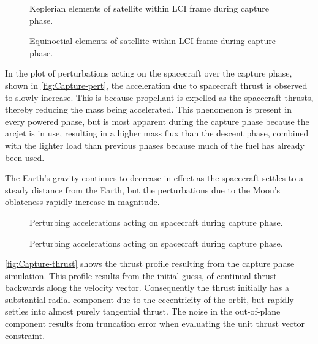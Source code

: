 \begin{figure}
\centering
\def\svgwidth{\figurewidth}

\caption{Keplerian elements of satellite within LCI frame during capture phase.}
\label{fig:Capture-kep-lci}
\end{figure}

\begin{figure}
\centering
\def\svgwidth{\figurewidth}

\caption{Equinoctial elements of satellite within LCI frame during capture phase.}
\label{fig:Capture-mee}
\end{figure}

In the plot of perturbations acting on the spacecraft over the capture phase, shown in \autoref{fig:Capture-pert}, the acceleration due to spacecraft thrust is observed to slowly increase. This is because propellant is expelled as the spacecraft thrusts, thereby reducing the mass being accelerated. This phenomenon is present in every powered phase, but is most apparent during the capture phase because the arcjet is in use, resulting in a higher mass flux than the descent phase, combined with the lighter load than previous phases because much of the fuel has already been used.

The Earth's gravity continues to decrease in effect as the spacecraft settles to a steady distance from the Earth, but the perturbations due to the Moon's oblateness rapidly increase in magnitude. 

\begin{figure}
\centering
\def\svgwidth{\figurewidth}

\caption{Perturbing accelerations acting on spacecraft during capture phase.}
\label{fig:Capture-pert}
\end{figure}

\begin{figure}
\centering
\def\svgwidth{\figurewidth}

\caption{Perturbing accelerations acting on spacecraft during capture phase.}
\label{fig:Capture-pert2}
\end{figure}

\autoref{fig:Capture-thrust} shows the thrust profile resulting from the capture phase simulation. This profile results from the initial guess, of continual thrust backwards along the velocity vector. Consequently the thrust initially has a substantial radial component due to the eccentricity of the orbit, but rapidly settles into almost purely tangential thrust. The noise in the out-of-plane component results from truncation error when evaluating the unit thrust vector constraint.

